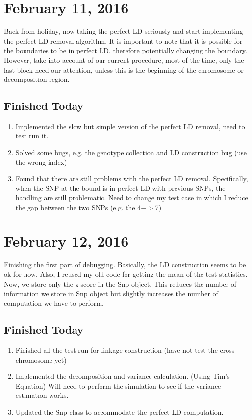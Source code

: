 \documentclass[12pt]{article}
\begin{document}
	\section{February 11, 2016}
	Back from holiday, now taking the perfect LD seriously and start implementing the perfect LD removal algorithm.
	It is important to note that it is possible for the boundaries to be in perfect LD, therefore potentially changing the boundary.
	However, take into account of our current procedure, most of the time, only the last block need our attention, unless this is the beginning of the chromosome or decomposition region.
	\subsection{Finished Today}
	\begin{enumerate}
		\item Implemented the slow but simple version of the perfect LD removal, need to test run it.
		\item Solved some bugs, e.g. the genotype collection and LD construction bug (use the wrong index)
		\item Found that there are still problems with the perfect LD removal.
		Specifically, when the SNP at the bound is in perfect LD with previous SNPs, the handling are still problematic. 
		Need to change my test case in which I reduce the gap between the two SNPs (e.g. the 4$->$7)
	\end{enumerate}
	\section{February 12, 2016}
	Finishing the first part of debugging. 
	Basically, the LD construction seems to be ok for now.
	Also, I reused my old code for getting the mean of the test-statistics.
	Now, we store only the z-score in the Snp object.
	This reduces the number of information we store in Snp object but slightly increases the number of computation we have to perform.
	\subsection{Finished Today}
	\begin{enumerate}
		\item Finished all the test run for linkage construction (have not test the cross chromosome yet)
		\item Implemented the decomposition and variance calculation. (Using Tim's Equation)
		Will need to perform the simulation to see if the variance estimation works. 
		\item Updated the Snp class to accommodate the perfect LD computation.
	\end{enumerate}
	
\end{document}
